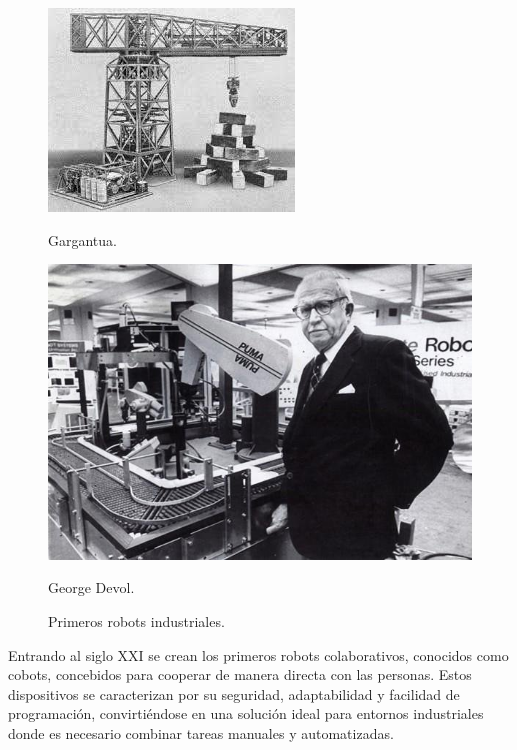\begin{figure}[ht!]
	\centering
	\begin{minipage}{0.44\linewidth}
		\centering
		\includegraphics[width=\linewidth]{figs/gargantua.jpg}
		\caption*{\centering Gargantua.}
	\end{minipage}
	\begin{minipage}{0.52\linewidth}
		\centering
		\includegraphics[width=\linewidth]{figs/George_Devol}
		\caption*{\centering George Devol.} 
	\end{minipage}
	\caption{Primeros robots industriales.}
	\label{fig:ancientrel}
\end{figure}

Entrando al siglo XXI se crean los primeros robots colaborativos, conocidos como cobots, concebidos para cooperar de manera directa con las personas. Estos dispositivos se caracterizan por su seguridad, adaptabilidad y facilidad de programación, convirtiéndose en una solución ideal para entornos industriales donde es necesario combinar tareas manuales y automatizadas. 

